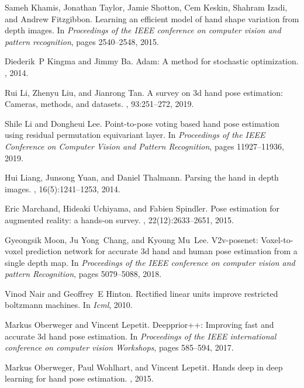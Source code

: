 \documentclass[10pt,twocolumn,letterpaper]{article}
\begin{document}
\begin{thebibliography}{10}
Sameh Khamis, Jonathan Taylor, Jamie Shotton, Cem Keskin, Shahram Izadi, and
  Andrew Fitzgibbon.
\newblock Learning an efficient model of hand shape variation from depth
  images.
\newblock In {\em Proceedings of the IEEE conference on computer vision and
  pattern recognition}, pages 2540--2548, 2015.

Diederik~P Kingma and Jimmy Ba.
\newblock Adam: A method for stochastic optimization.
, 2014.

Rui Li, Zhenyu Liu, and Jianrong Tan.
\newblock A survey on 3d hand pose estimation: Cameras, methods, and datasets.
, 93:251--272, 2019.

Shile Li and Dongheui Lee.
\newblock Point-to-pose voting based hand pose estimation using residual
  permutation equivariant layer.
\newblock In {\em Proceedings of the IEEE Conference on Computer Vision and
  Pattern Recognition}, pages 11927--11936, 2019.

Hui Liang, Junsong Yuan, and Daniel Thalmann.
\newblock Parsing the hand in depth images.
, 16(5):1241--1253, 2014.

Eric Marchand, Hideaki Uchiyama, and Fabien Spindler.
\newblock Pose estimation for augmented reality: a hands-on survey.
,
  22(12):2633--2651, 2015.

Gyeongsik Moon, Ju Yong~Chang, and Kyoung Mu~Lee.
\newblock V2v-posenet: Voxel-to-voxel prediction network for accurate 3d hand
  and human pose estimation from a single depth map.
\newblock In {\em Proceedings of the IEEE conference on computer vision and
  pattern Recognition}, pages 5079--5088, 2018.

Vinod Nair and Geoffrey~E Hinton.
\newblock Rectified linear units improve restricted boltzmann machines.
\newblock In {\em Icml}, 2010.

Markus Oberweger and Vincent Lepetit.
\newblock Deepprior++: Improving fast and accurate 3d hand pose estimation.
\newblock In {\em Proceedings of the IEEE international conference on computer
  vision Workshops}, pages 585--594, 2017.

Markus Oberweger, Paul Wohlhart, and Vincent Lepetit.
\newblock Hands deep in deep learning for hand pose estimation.
, 2015.


\end{thebibliography}
\end{document}

